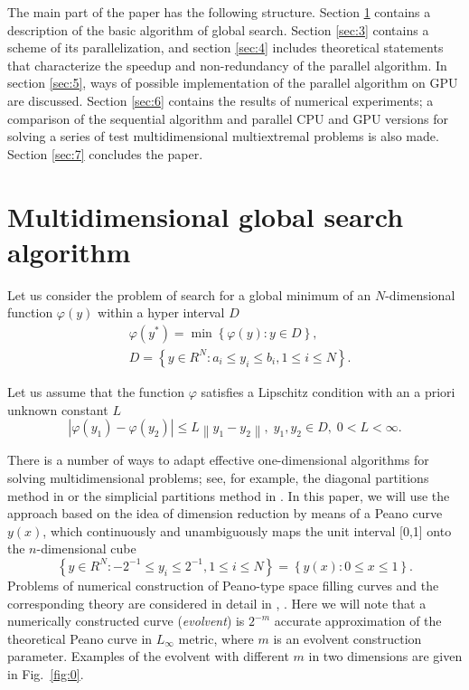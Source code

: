 \documentclass[smallcondensed]{svjour3}     %
\begin{document}
The main part of the paper has the following structure. Section \ref{sec:2} contains a description of the basic algorithm of global search. Section \ref{sec:3} contains a scheme of its parallelization, and section \ref{sec:4} includes theoretical statements that characterize the speedup and non-redundancy of the parallel algorithm. In section \ref{sec:5}, ways of possible implementation of the parallel algorithm on GPU are discussed. Section \ref{sec:6} contains the results of numerical experiments; a comparison of the sequential algorithm and parallel CPU and GPU versions for solving a series of test multidimensional multiextremal problems is also made. Section \ref{sec:7} concludes the paper.

\section{Multidimensional global search algorithm} \label{sec:2}

Let us consider the problem of search for a global minimum of an $N$-dimensional function $\varphi(y)$ within a hyper interval $D$
\begin{eqnarray}\label{eq:1}
& \varphi(y^\ast)=\min{\left\{\varphi(y):y\in D\right\}},\\
& D=\left\{y\in R^N: a_i\leq y_i \leq b_i, 1\leq i \leq N\right\}. \nonumber
\end{eqnarray}

Let us assume that the function $\varphi$ satisfies a Lipschitz condition with an a priori unknown constant $L$
\[
\left|\varphi(y_1)-\varphi(y_2)\right|\leq L\left\|y_1-y_2\right\|,\; y_1,y_2 \in D,\; 0<L<\infty.
\]

There is a number of ways to adapt effective one-dimensional algorithms for solving multidimensional problems; see, for example, the diagonal partitions method in \cite{RefSergeyev2006} or the simplicial partitions method in \cite{RefZilinskas}. In this paper, we will use the approach based on the idea of dimension reduction by means of a Peano curve $y(x)$, which continuously and unambiguously maps the unit interval [0,1] onto the $n$-dimensional cube
\[
\left\{y\in R^N: -2^{-1}\leq y_i \leq 2^{-1}, 1 \leq i \leq N\right\}=\left\{y(x):0\leq x \leq 1 \right\}.
\]
Problems of numerical construction of Peano-type space filling curves and the corresponding theory are considered in detail in \cite{RefStrongin2000}, \cite{RefSergeyev2013}.  
Here we will note that a numerically constructed curve (\textit{evolvent}) is $2^{-m}$ accurate approximation of the theoretical Peano curve in $L_\infty$ metric, where $m$ is an evolvent construction parameter. Examples of the evolvent with different $m$ in two dimensions are given in Fig.~\ref{fig:0}.
\end{document}
